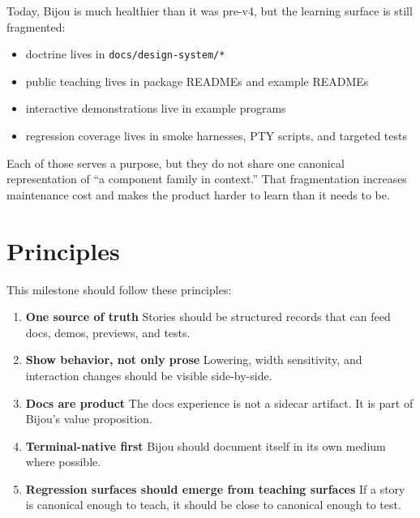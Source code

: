 Today, Bijou is much healthier than it was pre-v4, but the learning surface is still fragmented:

\begin{itemize}
\tightlist
\item
  doctrine lives in \texttt{d\allowbreak{}o\allowbreak{}c\allowbreak{}s\allowbreak{}/\allowbreak{}d\allowbreak{}e\allowbreak{}s\allowbreak{}i\allowbreak{}g\allowbreak{}n\allowbreak{}-\allowbreak{}s\allowbreak{}y\allowbreak{}s\allowbreak{}t\allowbreak{}e\allowbreak{}m\allowbreak{}/\allowbreak{}*}
\item
  public teaching lives in package READMEs and example READMEs
\item
  interactive demonstrations live in example programs
\item
  regression coverage lives in smoke harnesses, PTY scripts, and targeted tests
\end{itemize}

Each of those serves a purpose, but they do not share one canonical representation of ``a component family in context.'' That fragmentation increases maintenance cost and makes the product harder to learn than it needs to be.

\section{Principles}\label{record-042-principles}

This milestone should follow these principles:

\begin{enumerate}
\def\labelenumi{\arabic{enumi}.}
\item
  \textbf{One source of truth} Stories should be structured records that can feed docs, demos, previews, and tests.
\item
  \textbf{Show behavior, not only prose} Lowering, width sensitivity, and interaction changes should be visible side-by-side.
\item
  \textbf{Docs are product} The docs experience is not a sidecar artifact. It is part of Bijou's value proposition.
\item
  \textbf{Terminal-native first} Bijou should document itself in its own medium where possible.
\item
  \textbf{Regression surfaces should emerge from teaching surfaces} If a story is canonical enough to teach, it should be close to canonical enough to test.
\end{enumerate}

